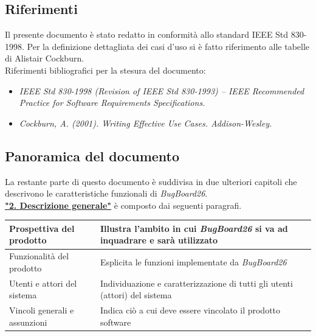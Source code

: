 \documentclass[a4paper,12pt]{article}
\begin{document}
\subsection{Riferimenti}
Il presente documento è stato redatto in conformità allo standard IEEE Std 830-1998. 
Per la definizione dettagliata dei casi d’uso si è fatto riferimento alle tabelle di Alistair Cockburn.\\
Riferimenti bibliografici per la stesura del documento:
\begin{itemize}
    \item \textit{IEEE Std 830-1998 (Revision of IEEE Std 830-1993) – IEEE Recommended Practice for Software Requirements Specifications.}
    \item \textit{Cockburn, A. (2001). Writing Effective Use Cases. Addison-Wesley.}
\end{itemize}
\subsection{Panoramica del documento}
La restante parte di questo documento è suddivisa in due ulteriori capitoli che descrivono le caratteristiche funzionali di \textit{BugBoard26}.\\
\hyperref[sec:descrizioneGenerale]{\textbf{"2. Descrizione generale"}} è composto dai seguenti paragrafi.
\begin{longtable}{|p{5cm}|p{9cm}|}
\hline
Prospettiva del prodotto & Illustra l'ambito in cui \textit{BugBoard26} si va ad inquadrare e sarà utilizzato\\ \hline
Funzionalità del prodotto & Esplicita le funzioni implementate da \textit{BugBoard26} \\ \hline
Utenti e attori del sistema & Individuazione e caratterizzazione di tutti gli utenti (attori) del sistema \\ \hline
Vincoli generali e assunzioni & Indica ciò a cui deve essere vincolato il prodotto software \\ \hline
\end{longtable}
\end{document}

